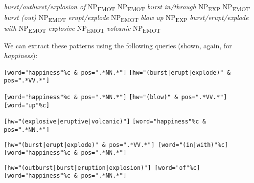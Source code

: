 \begin{exe}
\ex
\begin{xlist} 
\label{ex:emotionpressure}
\ex \textit{burst/outburst/explosion of} NP\textsubscript{EMOT}
\ex NP\textsubscript{EMOT} \textit{burst in/through} NP\textsubscript{EXP}
\ex NP\textsubscript{EMOT} \textit{burst (out)}
\ex NP\textsubscript{EMOT} \textit{erupt/explode}
\ex NP\textsubscript{EMOT} \textit{blow up}
\ex NP\textsubscript{EXP} \textit{burst/erupt/explode with} NP\textsubscript{EMOT}
\ex \textit{explosive} NP\textsubscript{EMOT}
\ex \textit{volcanic} NP\textsubscript{EMOT}
\end{xlist}
\end{exe}

We can extract these patterns using the following queries (shown, again, for \textit{happiness}):

\begin{exe}
\ex 
\begin{xlist} 
\label{ex:emotionburstingquery}
\ex \begin{minipage}[t]{0.85\textwidth} \raggedright \texttt{[word="happiness"\%c \& pos=".*NN.*"]} \texttt{[hw="(burst|\allowbreak erupt|\allowbreak explode)" \& pos=".*VV.*"]} \end{minipage}
\ex \begin{minipage}[t]{0.85\textwidth} \raggedright \texttt{[word="happiness"\%c \& pos=".*NN.*"]} \texttt{[hw="(blow)" \& pos=".*VV.*"][word="up"\%c]} \end{minipage}
\ex \begin{minipage}[t]{0.85\textwidth} \raggedright \texttt{[hw="(explosive|\allowbreak eruptive|\allowbreak volcanic)"]} \texttt{[word="happiness"\%c \& pos=".*NN.*"]} \end{minipage}
\ex \begin{minipage}[t]{0.85\textwidth} \raggedright \texttt{[hw="(burst|\allowbreak erupt|\allowbreak explode)" \& pos=".*VV.*"] [word="(in|\allowbreak with)"\%c]} \texttt{[word="happiness"\%c \& pos=".*NN.*"]} \end{minipage}
\ex \begin{minipage}[t]{0.85\textwidth} \raggedright \texttt{[hw="(outburst|\allowbreak burst|\allowbreak eruption|\allowbreak explosion)"] [word="of"\%c]} \texttt{[word="happiness"\%c \& pos=".*NN.*"]} \end{minipage}
\end{xlist} 
\end{exe}

